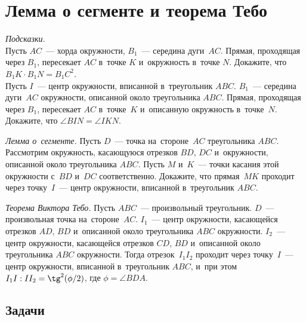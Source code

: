
\section*{Лемма о сегменте и теорема Тебо}


\begin{problems}

\item
\emph{Подсказки.}
\\
\subproblem
Пусть $AC$~--- хорда окружности, $B_1$~--- середина дуги~$AC$.
Прямая, проходящая через $B_1$, пересекает $AC$ в~точке $K$ и~окружность
в~точке $N$.
Докажите, что $B_1 K \cdot B_1 N = {B_1 C}^2$.
\\
\subproblem
Пусть $I$~--- центр окружности, вписанной в~треугольник $ABC$.
$B_1$~--- середина дуги~$AC$ окружности, описанной около треугольника $ABC$.
Прямая, проходящая через $B_1$, пересекает $AC$ в~точке~$K$ и~описанную
окружность в~точке~$N$.
Докажите, что $\angle BIN = \angle IKN$.

\item\emph{Лемма о~сегменте.}
Пусть $D$~--- точка на~стороне~$AC$ треугольника $ABC$.
Рассмотрим окружность, касающуюся отрезков $BD$, $DC$ и~окружности, описанной
около треугольника $ABC$.
Пусть $M$ и~$K$~--- точки касания этой окружности с~$BD$ и~$DC$ соответственно.
Докажите, что прямая~$MK$ проходит через точку~$I$~--- центр окружности,
вписанной в~треугольник $ABC$.

\item\emph{Теорема Виктора Тебо.}
Пусть $ABC$~--- произвольный треугольник.
$D$~--- произвольная точка на~стороне~$AC$.
$I_1$~--- центр окружности, касающейся отрезков $AD$, $BD$ и~описанной около
треугольника $ABC$ окружности.
$I_2$~--- центр окружности, касающейся отрезков $CD$, $BD$ и~описанной около
треугольника $ABC$ окружности.
Тогда отрезок~$I_1 I_2$ проходит через точку~$I$~--- центр окружности,
вписанной в~треугольник $ABC$, и~при этом
$I_1 I : I I_2 = \tg^2(\phi / 2)$, где $\phi = \angle BDA$.

\end{problems}

\subsection*{Задачи}

